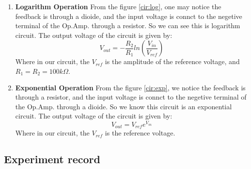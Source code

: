 \begin{enumerate}
            \item \textbf{Logarithm Operation}\newline
                From the figure \ref{cir:log}, one may notice the feedback is through a dioide, and the input voltage is connct to the negetive terminal of the Op.Amp. through a resistor.
                So we can see this is logarithm circuit. The output voltage of the circuit is given by:
                \begin{equation}
                    V_{out} = -\frac{R_2}{R_1}ln\left(\frac{V_{in}}{V_{ref}}\right)
                \end{equation}
                Where in our circuit, the $V_{ref}$ is the amplitude of the reference voltage, and $R_1 = R_2 = 100k \Omega$.
                \newline
            \item \textbf{Exponential Operation}\newline
                From the figure \ref{cir:exp}, we notice the feedback is through a resistor, and the input voltage is connct to the negetive terminal of the Op.Amp. through a dioide.
                So we know this circuit is an exponential circuit. The output voltage of the circuit is given by:
                \begin{equation}
                    V_{out} = V_{ref}e^{V_{in}}
                    \label{eq:exp}
                \end{equation}
                Where in our circuit, the $V_{ref}$ is the reference voltage.
        \end{enumerate}

\subsection{Experiment record}
